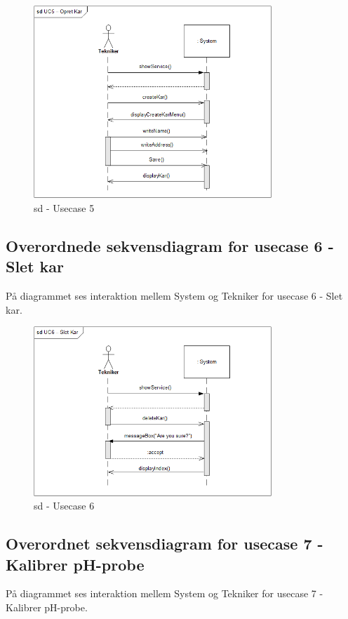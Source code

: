 \begin{figure}[H]
    \centering
    \includegraphics[width=0.8\textwidth]{Systemarkitektur/OverordnedeSekvensdiagrammer/sd_UC5.PNG}
    \caption{sd - Usecase 5}
    \label{fig:sd_UC5}
\end{figure}

\subsection{Overordnede sekvensdiagram for usecase 6 - Slet kar}
På diagrammet ses interaktion mellem System og Tekniker for usecase 6 - Slet kar.

\begin{figure}[H]
    \centering
    \includegraphics[width=0.8\textwidth]{Systemarkitektur/OverordnedeSekvensdiagrammer/sd_UC6.PNG}
    \caption{sd - Usecase 6}
    \label{fig:sd_UC6}
\end{figure}

\subsection{Overordnet sekvensdiagram for usecase 7 - Kalibrer pH-probe}
På diagrammet ses interaktion mellem System og Tekniker for usecase 7 - Kalibrer pH-probe.

